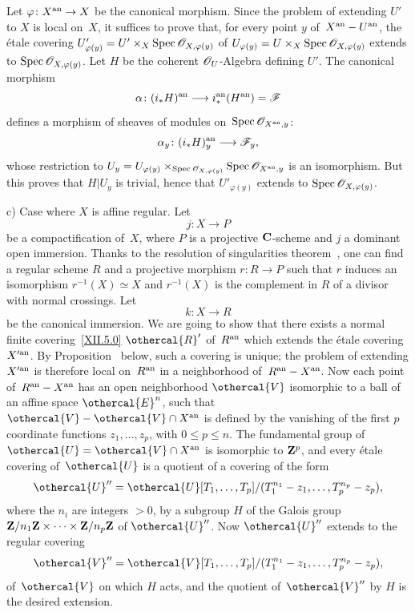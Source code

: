 Let $\varphi\colon X^{\an}\to X$ be the canonical morphism. Since the
problem of extending $U'$ to $X$ is local on~$X$, it suffices
to prove that, for every point $y$ of~$X^{\mathrm{an}}- U^{\mathrm{an}}$, the \'etale covering
$U'_{\varphi(y)}=U'\times_{X}\Spec\cal{O}_{X,\varphi(y)}$ of
$U_{\varphi(y)}=U\times_{X}\Spec\cal{O}_{X,\varphi(y)}$ extends
to $\Spec\cal{O}_{X,\varphi(y)}$. Let $H$ be the coherent
$\cal{O}_{U}$-Algebra defining $U'$. The canonical
morphism
$$
\alpha\colon (i_*H)^{\an} \to i_*^{\an}(H^{\an})
=\cal{F}
$$
defines a morphism of sheaves of modules on~$\Spec\cal{O}_{X^{\an},y}$:
$$
\alpha_{y}\colon (i_*H)^{\an}_{y} \to \cal{F}_{y}\quoi,
$$
whose restriction to $U_{y}=U_{\varphi(y)}
\times_{\Spec\cal{O}_{X,\varphi(y)}}\Spec\cal{O}_{X^{\an},y}$ is an
isomorphism. But this proves that $H|U_{y}$ is trivial, hence that
$U'_{\varphi(y)}$ extends to $\Spec\cal{O}_{X,\varphi(y)}$.

c) Case where $X$ is affine regular. Let
$$
j\colon X\to P
$$
be a compactification of~$X$, where $P$ is a projective
$\mathbf{C}$-scheme and $j$ a dominant open immersion. Thanks to the
resolution of singularities theorem~\cite{XII.8}, one can
find a regular scheme $R$ and a projective morphism
$r\colon R\to P$ such that $r$ induces an isomorphism $r^{-1}(X)\simeq
X$ and $r^{-1}(X)$ is the complement in $R$ of a
divisor with normal crossings. Let
$$
k\colon X\to R
$$
be the canonical immersion. We are going to show that there exists a normal
finite covering~\eqref{XII.5.0} $\othercal{R}'$ of~$R^{\mathrm{an}}$ which extends the
\'etale covering $X^{\prime\mathrm{an}}$. By
Proposition~ below, such a covering is
unique; the problem of extending $X^{\prime\mathrm{an}}$ is therefore local on~$R^{\mathrm{an}}$ in a neighborhood of~$R^{\mathrm{an}}- X^{\mathrm{an}}$. Now each
point of~$R^{\mathrm{an}}- X^{\mathrm{an}}$ has an open neighborhood
$\othercal{V}$ isomorphic to a ball of an affine space
$\othercal{E}^{n}$, such that $\othercal{V}- \othercal{V}\cap X^{\an}$
is defined by the vanishing of the first $p$ coordinate
functions $z_{1},\dots,z_{p}$, with $0\leq p\leq n$. The fundamental
group of~$\othercal{U}=\othercal{V}\cap X^{\an}$ is isomorphic to
$\mathbf{Z}^{p}$, and every \'etale covering of~$\othercal{U}$ is a quotient
of a covering of the form
$$
\othercal{U}''= \othercal{U}[T_{1},\dots,T_{p}]/
(T_{1}^{n_{1}}-z_{1},\dots,T_{p}^{n_{p}}-z_{p})\quoi,
$$
where the $n_{i}$ are integers $>0$, by a subgroup $H$ of the
Galois group $\mathbf{Z}/n_{1}\mathbf{Z}\times\cdots\times\mathbf{Z}/n_{p}\mathbf{Z}$ of
$\othercal{U}''$. Now $\othercal{U}''$ extends to the regular
covering
$$
\othercal{V}''= \othercal{V}[T_{1},\dots,T_{p}]/
(T_{1}^{n_{1}}-z_{1},\dots,T_{p}^{n_{p}}-z_{p})\quoi,
$$
of~$\othercal{V}$ on which $H$ acts, and the quotient of~$\othercal{V}''$
by $H$ is the desired extension.

